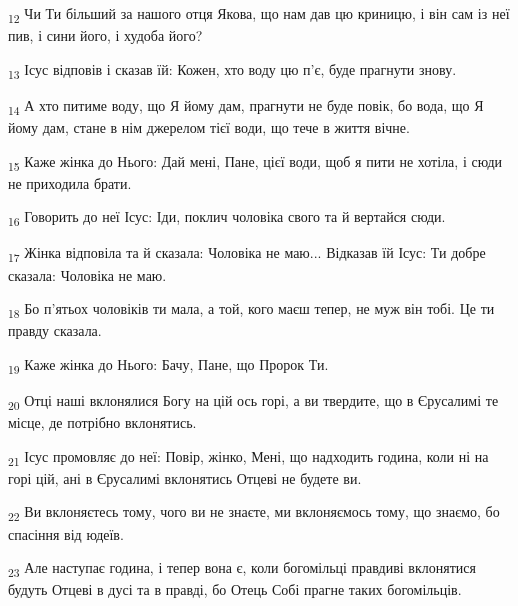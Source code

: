 \begin{tcolorbox}
\textsubscript{12} Чи Ти більший за нашого отця Якова, що нам дав цю криницю, і він сам із неї пив, і сини його, і худоба його?
\end{tcolorbox}
\begin{tcolorbox}
\textsubscript{13} Ісус відповів і сказав їй: Кожен, хто воду цю п'є, буде прагнути знову.
\end{tcolorbox}
\begin{tcolorbox}
\textsubscript{14} А хто питиме воду, що Я йому дам, прагнути не буде повік, бо вода, що Я йому дам, стане в нім джерелом тієї води, що тече в життя вічне.
\end{tcolorbox}
\begin{tcolorbox}
\textsubscript{15} Каже жінка до Нього: Дай мені, Пане, цієї води, щоб я пити не хотіла, і сюди не приходила брати.
\end{tcolorbox}
\begin{tcolorbox}
\textsubscript{16} Говорить до неї Ісус: Іди, поклич чоловіка свого та й вертайся сюди.
\end{tcolorbox}
\begin{tcolorbox}
\textsubscript{17} Жінка відповіла та й сказала: Чоловіка не маю... Відказав їй Ісус: Ти добре сказала: Чоловіка не маю.
\end{tcolorbox}
\begin{tcolorbox}
\textsubscript{18} Бо п'ятьох чоловіків ти мала, а той, кого маєш тепер, не муж він тобі. Це ти правду сказала.
\end{tcolorbox}
\begin{tcolorbox}
\textsubscript{19} Каже жінка до Нього: Бачу, Пане, що Пророк Ти.
\end{tcolorbox}
\begin{tcolorbox}
\textsubscript{20} Отці наші вклонялися Богу на цій ось горі, а ви твердите, що в Єрусалимі те місце, де потрібно вклонятись.
\end{tcolorbox}
\begin{tcolorbox}
\textsubscript{21} Ісус промовляє до неї: Повір, жінко, Мені, що надходить година, коли ні на горі цій, ані в Єрусалимі вклонятись Отцеві не будете ви.
\end{tcolorbox}
\begin{tcolorbox}
\textsubscript{22} Ви вклоняєтесь тому, чого ви не знаєте, ми вклоняємось тому, що знаємо, бо спасіння від юдеїв.
\end{tcolorbox}
\begin{tcolorbox}
\textsubscript{23} Але наступає година, і тепер вона є, коли богомільці правдиві вклонятися будуть Отцеві в дусі та в правді, бо Отець Собі прагне таких богомільців.
\end{tcolorbox}
